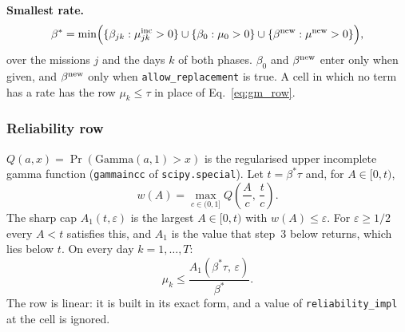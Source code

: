 \textbf{Smallest rate.}
\begin{equation}
  \beta^* = \min\Bigl(\{\beta_{jk} : \mu^{\mathrm{inc}}_{jk} > 0\}
    \cup \{\beta_0 : \mu_0 > 0\} \cup \{\beta^{\mathrm{new}} : \mu^{\mathrm{new}} > 0\}\Bigr),
  \label{eq:gm_betastar}
\end{equation}
over the missions $j$ and the days $k$ of both phases. $\beta_0$ and $\beta^{\mathrm{new}}$
enter only when given, and $\beta^{\mathrm{new}}$ only when \texttt{allow\_replacement} is
true. A cell in which no term has a rate has the row $\mu_k \leq \tau$ in place of
Eq.~\eqref{eq:gm_row}.

\subsubsection{Reliability row}

$Q(a, x) = \Pr(\mathrm{Gamma}(a, 1) > x)$ is the regularised upper incomplete gamma
function (\texttt{gammaincc} of \texttt{scipy.special}). Let $t = \beta^*\tau$ and, for
$A \in [0, t)$,
\[
  w(A) = \max_{c \in (0, 1]} Q\!\left(\frac{A}{c},\, \frac{t}{c}\right).
\]
The sharp cap $A_1(t, \varepsilon)$ is the largest $A \in [0, t)$ with
$w(A) \leq \varepsilon$. For $\varepsilon \geq 1/2$ every $A < t$ satisfies this,
and $A_1$ is the value that step~3 below returns, which lies below $t$. On every
day $k = 1, \ldots, T$:
\begin{equation}
  \mu_k \leq \frac{A_1(\beta^*\tau,\, \varepsilon)}{\beta^*}.
  \label{eq:gm_row}
\end{equation}
The row is linear: it is built in its exact form, and a value of
\texttt{reliability\_impl} at the cell is ignored.

